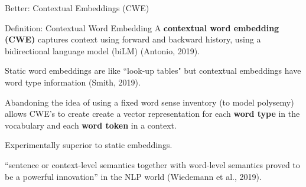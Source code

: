 \begin{frame}{Better: Contextual Embeddings (CWE)}


\begin{definitionBlock}{Definition: Contextual Word Embedding}
      \small
    A \textbf{\alert{contextual word embedding (CWE)}} captures context using forward and backward history, using a bidirectional language model (biLM) (Antonio, 2019).   
    
    Static word embeddings are like ``look-up tables" but contextual embeddings have word type information (Smith, 2019). 
\end{definitionBlock}


\begin{itemizeSpaced}{7pt}

    \pinkbox Abandoning the idea of using a fixed word sense inventory (to model polysemy) allows CWE's to create create a vector representation for each \textbf{word type} in the vocabulary and each \textbf{word token} in a context. 
    
    \item Experimentally superior to static embeddings.
    
    \item ``sentence or context-level semantics together with word-level semantics proved to be a powerful innovation” in the NLP world (Wiedemann et al., 2019).
    
    
\end{itemizeSpaced}
    
\end{frame}